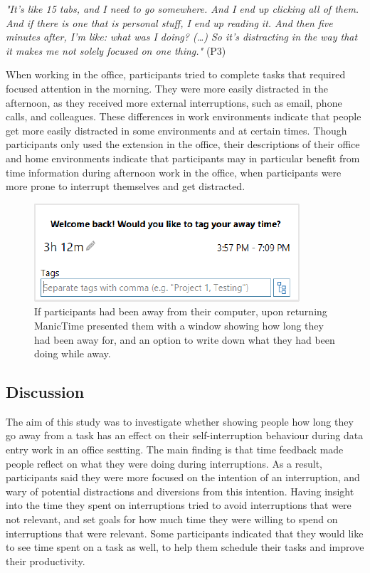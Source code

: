 \textit{"It’s like 15 tabs, and I need to go somewhere. And I end up clicking all of them. And if there is one that is personal stuff, I end up reading it. And then five minutes after, I’m like: what was I doing? (…) So it’s distracting in the way that it makes me not solely focused on one thing."} (P3)

When working in the office, participants tried to complete tasks that required focused attention in the morning. They were more easily distracted in the afternoon, as they received more external interruptions, such as email, phone calls, and colleagues. These differences in work environments indicate that people get more easily distracted in some environments and at certain times. Though participants only used the extension in the office, their descriptions of their office and home environments indicate that participants may in particular benefit from time information during afternoon work in the office, when participants were more prone to interrupt themselves and get distracted.

\begin{figure}
\centering
\centerline{\includegraphics[scale=1]{images/ch56/ch56_MTaway.pdf}}
\caption[Study 7 ManicTime feedback on non-digital interruptions]{ If participants had been away from their computer, upon returning ManicTime presented them with a window showing how long they had been away for, and an option to write down what they had been doing while away.}
\label{fig:ch56-7_mtaway}
\end{figure}

\subsection{Discussion}
The aim of this study was to investigate whether showing people how long they go away from a task has an effect on their self-interruption behaviour during data entry work in an office sestting. The main finding is that time feedback made people reflect on what they were doing during interruptions. As a result, participants said they were more focused on the intention of an interruption, and wary of potential distractions and diversions from this intention. Having insight into the time they spent on interruptions tried to avoid interruptions that were not relevant, and set goals for how much time they were willing to spend on interruptions that were relevant. Some participants indicated that they would like to see time spent on a task as well, to help them schedule their tasks and improve their productivity. 

